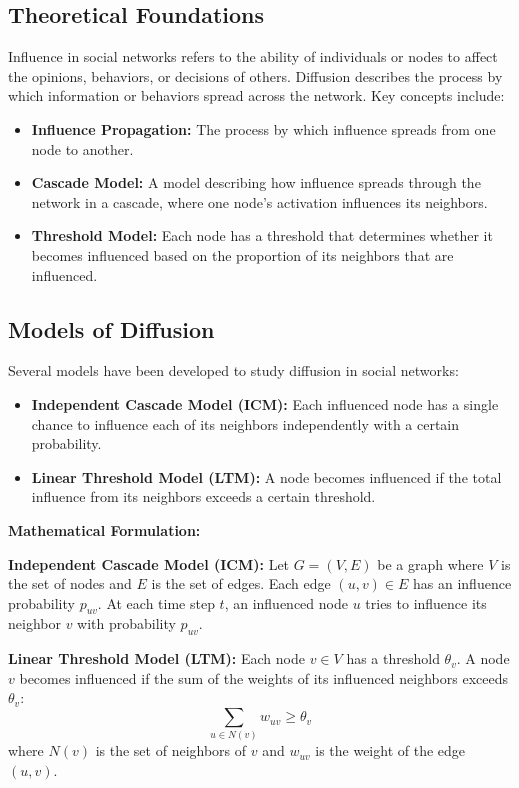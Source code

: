 \documentclass[12pt]{book} %
\begin{document}
\subsection{Theoretical Foundations}

Influence in social networks refers to the ability of individuals or nodes to affect the opinions, behaviors, or decisions of others. Diffusion describes the process by which information or behaviors spread across the network. Key concepts include:

\begin{itemize}
    \item \textbf{Influence Propagation:} The process by which influence spreads from one node to another.
    \item \textbf{Cascade Model:} A model describing how influence spreads through the network in a cascade, where one node's activation influences its neighbors.
    \item \textbf{Threshold Model:} Each node has a threshold that determines whether it becomes influenced based on the proportion of its neighbors that are influenced.
\end{itemize}

\subsection{Models of Diffusion}

Several models have been developed to study diffusion in social networks:

\begin{itemize}
    \item \textbf{Independent Cascade Model (ICM):} Each influenced node has a single chance to influence each of its neighbors independently with a certain probability.
    \item \textbf{Linear Threshold Model (LTM):} A node becomes influenced if the total influence from its neighbors exceeds a certain threshold.
\end{itemize}

\textbf{Mathematical Formulation:}

\textbf{Independent Cascade Model (ICM):} Let \(G = (V, E)\) be a graph where \(V\) is the set of nodes and \(E\) is the set of edges. Each edge \((u, v) \in E\) has an influence probability \(p_{uv}\). At each time step \(t\), an influenced node \(u\) tries to influence its neighbor \(v\) with probability \(p_{uv}\).

\textbf{Linear Threshold Model (LTM):} Each node \(v \in V\) has a threshold \(\theta_v\). A node \(v\) becomes influenced if the sum of the weights of its influenced neighbors exceeds \(\theta_v\):
\[
\sum_{u \in N(v)} w_{uv} \geq \theta_v
\]
where \(N(v)\) is the set of neighbors of \(v\) and \(w_{uv}\) is the weight of the edge \((u, v)\).
\end{document}
